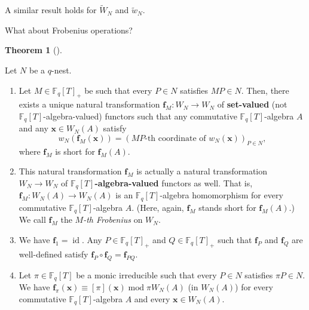 \documentclass[numbers=enddot,12pt,final,onecolumn,notitlepage]{scrartcl}%
\theoremstyle{definition}
\newtheorem{theo}{Theorem}[section]
\newenvironment{theorem}[1][]
{\begin{theo}[#1]\begin{leftbar}}
{\end{leftbar}\end{theo}}
\begin{document}
A similar result holds for $\widetilde{W}_{N}$ and $\widetilde{w}_{N}$.

What about Frobenius operations?

\begin{theorem}
\label{thm.carlitz.Witt.frob}Let $N$ be a $q$-nest.

\begin{enumerate}
\item[\textbf{(a)}] Let $M\in\mathbb{F}_{q}\left[  T\right]  _{+}$ be such
that every $P\in N$ satisfies $MP\in N$. Then, there exists a unique natural
transformation $\mathbf{f}_{M}:W_{N}\rightarrow W_{N}$ of \textbf{set-valued}
(not $\mathbb{F}_{q}\left[  T\right]  $-algebra-valued) functors such that any
commutative $\mathbb{F}_{q}\left[  T\right]  $-algebra $A$ and any
$\mathbf{x}\in W_{N}\left(  A\right)  $ satisfy%
\[
w_{N}\left(  \mathbf{f}_{M}\left(  \mathbf{x}\right)  \right)  =\left(
MP\text{-th coordinate of }w_{N}\left(  \mathbf{x}\right)  \right)  _{P\in
N},
\]
where $\mathbf{f}_{M}$ is short for $\mathbf{f}_{M}\left(  A\right)  $.

\item[\textbf{(b)}] This natural transformation $\mathbf{f}_{M}$ is actually a
natural transformation $W_{N}\rightarrow W_{N}$ of $\mathbb{F}_{q}\left[
T\right]  $\textbf{-algebra-valued} functors as well. That is, $\mathbf{f}%
_{M}:W_{N}\left(  A\right)  \rightarrow W_{N}\left(  A\right)  $ is an
$\mathbb{F}_{q}\left[  T\right]  $-algebra homomorphism for every commutative
$\mathbb{F}_{q}\left[  T\right]  $-algebra $A$. (Here, again, $\mathbf{f}_{M}$
stands short for $\mathbf{f}_{M}\left(  A\right)  $.) We call $\mathbf{f}_{M}$
the $M$\textit{-th Frobenius} on $W_{N}$.

\item[\textbf{(c)}] We have $\mathbf{f}_{1}=\operatorname*{id}$. Any
$P\in\mathbb{F}_{q}\left[  T\right]  _{+}$ and $Q\in\mathbb{F}_{q}\left[
T\right]  _{+}$ such that $\mathbf{f}_{P}$ and $\mathbf{f}_{Q}$ are
well-defined satisfy $\mathbf{f}_{P}\circ\mathbf{f}_{Q}=\mathbf{f}_{PQ}$.

\item[\textbf{(d)}] Let $\pi\in\mathbb{F}_{q}\left[  T\right]  $ be a monic
irreducible such that every $P\in N$ satisfies $\pi P\in N$. We have
$\mathbf{f}_{\pi}\left(  \mathbf{x}\right)  \equiv\left[  \pi\right]  \left(
\mathbf{x}\right)  \operatorname{mod}\pi W_{N}\left(  A\right)  $ (in
$W_{N}\left(  A\right)  $) for every commutative $\mathbb{F}_{q}\left[
T\right]  $-algebra $A$ and every $\mathbf{x}\in W_{N}\left(  A\right)  $.
\end{enumerate}
\end{theorem}
\end{document}
